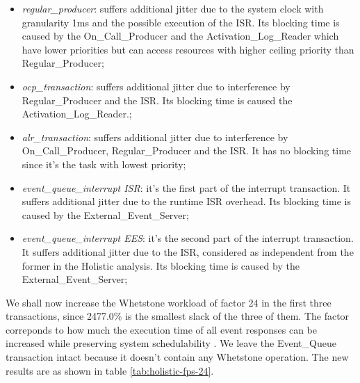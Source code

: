 \documentclass{article}
\begin{document}
\begin{itemize}
   \item \textit{regular\_producer}: suffers additional jitter due to the system clock with granularity 1ms and the possible execution of the ISR. Its blocking time is caused by the On\_Call\_Producer and the Activation\_Log\_Reader which have lower priorities but can access resources with higher ceiling priority than Regular\_Producer;
   \item \textit{ocp\_transaction}: suffers additional jitter due to interference by Regular\_Producer and the ISR. Its blocking time is caused the Activation\_Log\_Reader.;
   \item \textit{alr\_transaction}: suffers additional jitter due to interference by On\_Call\_Producer, Regular\_Producer and the ISR. It has no blocking time since it's the task with lowest priority;
   \item \textit{event\_queue\_interrupt ISR}: it's the first part of the interrupt transaction. It suffers additional jitter due to the runtime ISR overhead. Its blocking time is caused by the External\_Event\_Server;
   \item \textit{event\_queue\_interrupt EES}: it's the second part of the interrupt transaction. It suffers additional jitter due to the ISR, considered as independent from the former in the Holistic analysis. Its blocking time is caused by the External\_Event\_Server;
\end{itemize}

We shall now increase the Whetstone workload of factor 24 in the first three transactions, since 2477.0\% is the smallest slack of the three of them. The factor correponds to how much the execution time of all event responses can be increased while preserving system schedulability \cite{practitioner-growth}. We leave the Event\_Queue transaction intact because it doesn't contain any Whetstone operation. The new results are as shown in table \ref{tab:holistic-fps-24}.
\end{document}
